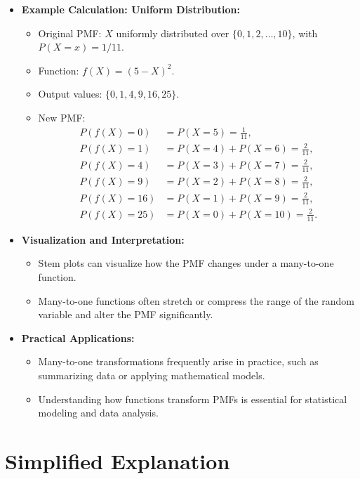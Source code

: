 \documentclass{article}
\begin{document}
\begin{itemize}
  \item \textbf{Example Calculation: Uniform Distribution:}
    \begin{itemize}
      \item Original PMF: $X$ uniformly distributed over $\{0, 1, 2, \dots, 10\}$, with $P(X = x) = 1/11$.
      \item Function: $f(X) = (5 - X)^2$.
      \item Output values: $\{0, 1, 4, 9, 16, 25\}$.
      \item New PMF:
        \begin{align*}
          P(f(X) = 0) &= P(X = 5) = \frac{1}{11}, \\
          P(f(X) = 1) &= P(X = 4) + P(X = 6) = \frac{2}{11}, \\
          P(f(X) = 4) &= P(X = 3) + P(X = 7) = \frac{2}{11}, \\
          P(f(X) = 9) &= P(X = 2) + P(X = 8) = \frac{2}{11}, \\
          P(f(X) = 16) &= P(X = 1) + P(X = 9) = \frac{2}{11}, \\
          P(f(X) = 25) &= P(X = 0) + P(X = 10) = \frac{2}{11}.
        \end{align*}
    \end{itemize}

  \item \textbf{Visualization and Interpretation:}
    \begin{itemize}
      \item Stem plots can visualize how the PMF changes under a many-to-one function.
      \item Many-to-one functions often stretch or compress the range of the random variable and alter the PMF significantly.
    \end{itemize}

  \item \textbf{Practical Applications:}
    \begin{itemize}
      \item Many-to-one transformations frequently arise in practice, such as summarizing data or applying mathematical models.
      \item Understanding how functions transform PMFs is essential for statistical modeling and data analysis.
    \end{itemize}
\end{itemize}

\section*{Simplified Explanation}
\end{document}
